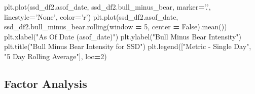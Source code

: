\documentclass[11,]{article}
\newenvironment{Shaded}{\begin{snugshade}}{\end{snugshade}}
\newcommand{\DecValTok}[1]{\textcolor[rgb]{0.00,0.00,0.81}{#1}}
\newcommand{\NormalTok}[1]{#1}
\newcommand{\OperatorTok}[1]{\textcolor[rgb]{0.81,0.36,0.00}{\textbf{#1}}}
\newcommand{\StringTok}[1]{\textcolor[rgb]{0.31,0.60,0.02}{#1}}
\newcommand{\VariableTok}[1]{\textcolor[rgb]{0.00,0.00,0.00}{#1}}
\begin{document}
\begin{Shaded}
\begin{Highlighting}[]
\NormalTok{plt.plot(ssd_df2.asof_date, ssd_df2.bull_minus_bear, marker}\OperatorTok{=}\StringTok{'.'}\NormalTok{, linestyle}\OperatorTok{=}\StringTok{'None'}\NormalTok{, color}\OperatorTok{=}\StringTok{'r'}\NormalTok{)}
\NormalTok{plt.plot(ssd_df2.asof_date, ssd_df2.bull_minus_bear.rolling(window }\OperatorTok{=} \DecValTok{5}\NormalTok{, center }\OperatorTok{=} \VariableTok{False}\NormalTok{).mean())}
\NormalTok{plt.xlabel(}\StringTok{"As Of Date (asof_date)"}\NormalTok{)}
\NormalTok{plt.ylabel(}\StringTok{"Bull Minus Bear Intensity"}\NormalTok{)}
\NormalTok{plt.title(}\StringTok{"Bull Minus Bear Intensity for SSD"}\NormalTok{)}
\NormalTok{plt.legend([}\StringTok{"Metric - Single Day"}\NormalTok{, }\StringTok{"5 Day Rolling Average"}\NormalTok{], loc}\OperatorTok{=}\DecValTok{2}\NormalTok{)}
\end{Highlighting}
\end{Shaded}

\hypertarget{factor-analysis}{%
\subsection{Factor Analysis}\label{factor-analysis}}
\end{document}

